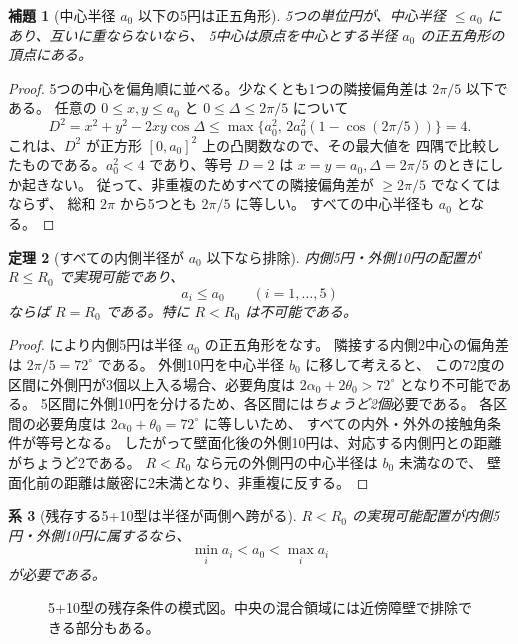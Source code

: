 \documentclass[11pt,a4paper]{article}
\theoremstyle{JPthm}
\newtheorem{theorem}{定理}[section]
\newtheorem{lemma}[theorem]{補題}
\newtheorem{corollary}[theorem]{系}
\theoremstyle{definition}
\newcommand{\Rc}{R_{0}}
\newcommand{\thzero}{\theta_{0}}
\newcommand{\azero}{a_{0}}
\newcommand{\bzero}{b_{0}}
\begin{document}
\begin{lemma}[中心半径 $\azero$ 以下の5円は正五角形]\label{lem:pentagon}
5つの単位円が、中心半径 $\le\azero$ にあり、互いに重ならないなら、
5中心は原点を中心とする半径 $\azero$ の正五角形の頂点にある。
\end{lemma}
\begin{proof}
5つの中心を偏角順に並べる。少なくとも1つの隣接偏角差は $2\pi/5$ 以下である。
任意の $0\le x,y\le\azero$ と $0\le\Delta\le2\pi/5$ について
\[
 D^2=x^2+y^2-2xy\cos\Delta
 \le \max\{\azero^2,\,2\azero^2(1-\cos(2\pi/5))\}=4.
\]
これは、$D^2$ が正方形 $[0,\azero]^2$ 上の凸関数なので、その最大値を
四隅で比較したものである。$\azero^2<4$ であり、等号 $D=2$ は
$x=y=\azero,\Delta=2\pi/5$ のときにしか起きない。
従って、非重複のためすべての隣接偏角差が $\ge2\pi/5$ でなくてはならず、
総和 $2\pi$ から5つとも $2\pi/5$ に等しい。
すべての中心半径も $\azero$ となる。
\end{proof}
\begin{theorem}[すべての内側半径が $\azero$ 以下なら排除]\label{thm:low}
内側5円・外側10円の配置が $R\le\Rc$ で実現可能であり、
\[
 a_i\le\azero\qquad(i=1,\ldots,5)
\]
ならば $R=\Rc$ である。特に $R<\Rc$ は不可能である。
\end{theorem}
\begin{proof}
により内側5円は半径 $\azero$ の正五角形をなす。
隣接する内側2中心の偏角差は $2\pi/5=72^\circ$ である。
外側10円を中心半径 $\bzero$ に移して考えると、
この72度の区間に外側円が3個以上入る場合、必要角度は
$2\alpha_0+2\thzero>72^\circ$ となり不可能である。
5区間に外側10円を分けるため、各区間には\emph{ちょうど2個}必要である。
各区間の必要角度は $2\alpha_0+\thzero=72^\circ$ に等しいため、
すべての内外・外外の接触角条件が等号となる。
したがって壁面化後の外側10円は、対応する内側円との距離がちょうど2である。
$R<\Rc$ なら元の外側円の中心半径は $\bzero$ 未満なので、
壁面化前の距離は厳密に2未満となり、非重複に反する。
\end{proof}
\begin{corollary}[残存する5+10型は半径が両側へ跨がる]\label{cor:mixed}
$R<\Rc$ の実現可能配置が内側5円・外側10円に属するなら、
\[
\boxed{\min_i a_i<\azero<\max_i a_i}
\]
が必要である。
\end{corollary}
\begin{figure}[H]\centering
{}
\caption{5+10型の残存条件の模式図。中央の混合領域には近傍障壁で排除できる部分もある。}
\end{figure}
\end{document}
